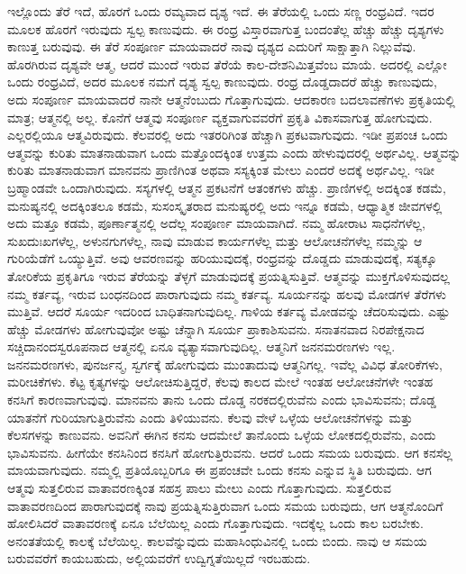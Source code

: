 ಇಲ್ಲೊಂದು ತೆರೆ ಇದೆ, ಹೊರಗೆ ಒಂದು ರಮ್ಯವಾದ ದೃಶ್ಯ ಇದೆ. ಈ ತೆರೆಯಲ್ಲಿ ಒಂದು ಸಣ್ಣ ರಂಧ್ರವಿದೆ. ಇದರ ಮೂಲಕ ಹೊರಗೆ ಇರುವುದು ಸ್ವಲ್ಪ ಕಾಣುವುದು. ಈ ರಂಧ್ರ ವಿಸ್ತಾರವಾಗುತ್ತ ಬಂದಂತೆಲ್ಲ ಹೆಚ್ಚು ಹೆಚ್ಚು ದೃಶ್ಯಗಳು ಕಾಣುತ್ತ ಬರುವುವು. ಈ ತೆರೆ ಸಂಪೂರ್ಣ ಮಾಯವಾದರೆ ನಾವು ದೃಶ್ಯದ ಎದುರಿಗೆ ಸಾಕ್ಷಾತ್ತಾಗಿ ನಿಲ್ಲುವೆವು. ಹೊರಗಿರುವ ದೃಶ್ಯವೇ ಆತ್ಮ, ಆದರೆ ಮುಂದೆ ಇರುವ ತೆರೆಯೆ ಕಾಲ-ದೇಶನಿಮಿತ್ತವೆಂಬ ಮಾಯೆ. ಅದರಲ್ಲಿ ಎಲ್ಲೋ ಒಂದು ರಂಧ್ರವಿದೆ, ಅದರ ಮೂಲಕ ನಮಗೆ ದೃಶ್ಯ ಸ್ವಲ್ಪ ಕಾಣುವುದು. ರಂಧ್ರ ದೊಡ್ಡದಾದರೆ ಹೆಚ್ಚು ಕಾಣುವುದು, ಅದು ಸಂಪೂರ್ಣ ಮಾಯವಾದರೆ ನಾನೇ ಆತ್ಮನೆಂಬುದು ಗೊತ್ತಾಗುವುದು. ಆದಕಾರಣ ಬದಲಾವಣೆಗಳು ಪ್ರಕೃತಿಯಲ್ಲಿ ಮಾತ್ರ; ಆತ್ಮನಲ್ಲಿ ಅಲ್ಲ. ಕೊನೆಗೆ ಆತ್ಮವು ಸಂಪೂರ್ಣ ವ್ಯಕ್ತವಾಗುವವರೆಗೆ ಪ್ರಕೃತಿ ವಿಕಾಸವಾಗುತ್ತ ಹೋಗುವುದು. ಎಲ್ಲರಲ್ಲಿಯೂ ಆತ್ಮವಿರುವುದು. ಕೆಲವರಲ್ಲಿ ಅದು ಇತರರಿಗಿಂತ ಹೆಚ್ಚಾಗಿ ಪ್ರಕಟವಾಗುವುದು. ಇಡೀ ಪ್ರಪಂಚ ಒಂದು ಆತ್ಮವನ್ನು ಕುರಿತು ಮಾತನಾಡುವಾಗ ಒಂದು ಮತ್ತೊಂದಕ್ಕಿಂತ ಉತ್ತಮ ಎಂದು ಹೇಳುವುದರಲ್ಲಿ ಅರ್ಥವಿಲ್ಲ. ಆತ್ಮವನ್ನು ಕುರಿತು ಮಾತನಾಡುವಾಗ ಮಾನವನು ಪ್ರಾಣಿಗಿಂತ ಅಥವಾ ಸಸ್ಯಕ್ಕಿಂತ ಮೇಲು ಎಂದರೆ ಅದಕ್ಕೆ ಅರ್ಥವಿಲ್ಲ. ಇಡೀ ಬ್ರಹ್ಮಾಂಡವೇ ಒಂದಾಗಿರುವುದು. ಸಸ್ಯಗಳಲ್ಲಿ ಆತ್ಮನ ಪ್ರಕಟನೆಗೆ ಆತಂಕಗಳು ಹೆಚ್ಚು. ಪ್ರಾಣಿಗಳಲ್ಲಿ ಅದಕ್ಕಿಂತ ಕಡಮೆ, ಮನುಷ್ಯನಲ್ಲಿ ಅದಕ್ಕಿಂತಲೂ ಕಡಮೆ, ಸುಸಂಸ್ಕೃತರಾದ ಮನುಷ್ಯರಲ್ಲಿ ಅದು ಇನ್ನೂ ಕಡಮೆ, ಆಧ್ಯಾತ್ಮಿಕ ಜೀವಗಳಲ್ಲಿ ಅದು ಮತ್ತೂ ಕಡಮೆ, ಪೂರ್ಣಾತ್ಮನಲ್ಲಿ ಅದೆಲ್ಲ ಸಂಪೂರ್ಣ ಮಾಯವಾಗಿದೆ. ನಮ್ಮ ಹೋರಾಟ ಸಾಧನೆಗಳೆಲ್ಲ, ಸುಖದುಃಖಗಳೆಲ್ಲ, ಅಳುನಗುಗಳೆಲ್ಲ, ನಾವು ಮಾಡುವ ಕಾರ್ಯಗಳೆಲ್ಲ ಮತ್ತು ಆಲೋಚನೆಗಳೆಲ್ಲ ನಮ್ಮನ್ನು ಆ ಗುರಿಯೆಡೆಗೆ ಒಯ್ಯುತ್ತಿವೆ. ಅವು ಆವರಣವನ್ನು ಹರಿಯುವುದಕ್ಕೆ, ರಂಧ್ರವನ್ನು ದೊಡ್ಡದು ಮಾಡುವುದಕ್ಕೆ, ಸತ್ಯಕ್ಕೂ ತೋರಿಕೆಯ ಪ್ರಕೃತಿಗೂ ಇರುವ ತೆರೆಯನ್ನು ತೆಳ್ಳಗೆ ಮಾಡುವುದಕ್ಕೆ ಪ್ರಯತ್ನಿಸುತ್ತಿವೆ. ಆತ್ಮವನ್ನು ಮುಕ್ತಗೊಳಿಸುವುದಲ್ಲ ನಮ್ಮ ಕರ್ತವ್ಯ, ಇರುವ ಬಂಧನದಿಂದ ಪಾರಾಗುವುದು ನಮ್ಮ ಕರ್ತವ್ಯ. ಸೂರ್ಯನನ್ನು ಹಲವು ಮೋಡಗಳ ತೆರೆಗಳು ಮುತ್ತಿವೆ. ಆದರೆ ಸೂರ್ಯ ಇದರಿಂದ ಬಾಧಿತನಾಗುವುದಿಲ್ಲ. ಗಾಳಿಯ ಕರ್ತವ್ಯ ಮೋಡವನ್ನು ಚೆದರಿಸುವುದು. ಎಷ್ಟು ಹೆಚ್ಚು ಮೋಡಗಳು ಹೋಗುವುವೋ ಅಷ್ಟು ಚೆನ್ನಾಗಿ ಸೂರ್ಯ ಪ್ರಾಕಾಶಿಸುವನು. ಸನಾತನವಾದ ನಿರಪೇಕ್ಷನಾದ ಸಚ್ಚಿದಾನಂದಸ್ವರೂಪನಾದ ಆತ್ಮನಲ್ಲಿ ಏನೂ ವ್ಯತ್ಯಾಸವಾಗುವುದಿಲ್ಲ. ಆತ್ಮನಿಗೆ ಜನನಮರಣಗಳು ಇಲ್ಲ. ಜನನಮರಣಗಳು, ಪುನರ್ಜನ್ಮ, ಸ್ವರ್ಗಕ್ಕೆ ಹೋಗುವುದು ಮುಂತಾದುವು ಆತ್ಮನಿಗಲ್ಲ. ಇವೆಲ್ಲ ವಿವಿಧ ತೋರಿಕೆಗಳು, ಮರೀಚಿಕೆಗಳು. ಕೆಟ್ಟ ಕೃತ್ಯಗಳನ್ನು ಆಲೋಚಿಸುತ್ತಿದ್ದರೆ, ಕೆಲವು ಕಾಲದ ಮೇಲೆ ಇಂತಹ ಆಲೋಚನೆಗಳೇ ಇಂತಹ ಕನಸಿಗೆ ಕಾರಣವಾಗುವುವು. ಮಾನವನು ತಾನು ಒಂದು ದೊಡ್ಡ ನರಕದಲ್ಲಿರುವೆನು ಎಂದು ಭಾವಿಸುವನು; ದೊಡ್ಡ ಯಾತನೆಗೆ ಗುರಿಯಾಗುತ್ತಿರುವೆನು ಎಂದು ತಿಳಿಯುವನು. ಕೆಲವು ವೇಳೆ ಒಳ್ಳೆಯ ಆಲೋಚನೆಗಳನ್ನು ಮತ್ತು ಕೆಲಸಗಳನ್ನು ಕಾಣುವನು. ಅವನಿಗೆ ಈಗಿನ ಕನಸು ಆದಮೇಲೆ ತಾನೊಂದು ಒಳ್ಳೆಯ ಲೋಕದಲ್ಲಿರುವೆನು, ಎಂದು ಭಾವಿಸುವನು. ಹೀಗೆಯೇ ಕನಸಿನಿಂದ ಕನಸಿಗೆ ಹೋಗುತ್ತಿರುವನು. ಆದರೆ ಒಂದು ಸಮಯ ಬರುವುದು. ಆಗ ಕನಸೆಲ್ಲ ಮಾಯವಾಗುವುದು. ನಮ್ಮಲ್ಲಿ ಪ್ರತಿಯೊಬ್ಬರಿಗೂ ಈ ಪ್ರಪಂಚವೇ ಒಂದು ಕನಸು ಎನ್ನುವ ಸ್ಥಿತಿ ಬರುವುದು. ಆಗ ಆತ್ಮವು ಸುತ್ತಲಿರುವ ವಾತಾವರಣಕ್ಕಿಂತ ಸಹಸ್ರ ಪಾಲು ಮೇಲು ಎಂದು ಗೊತ್ತಾಗುವುದು. ಸುತ್ತಲಿರುವ ವಾತಾವರಣದಿಂದ ಪಾರಾಗುವುದಕ್ಕೆ ನಾವು ಪ್ರಯತ್ನಿಸುತ್ತಿರುವಾಗ ಒಂದು ಸಮಯ ಬರುವುದು, ಆಗ ಆತ್ಮನೊಂದಿಗೆ ಹೋಲಿಸಿದರೆ ವಾತಾವರಣಕ್ಕೆ ಏನೂ ಬೆಲೆಯಿಲ್ಲ ಎಂದು ಗೊತ್ತಾಗುವುದು. ಇದಕ್ಕೆಲ್ಲ ಒಂದು ಕಾಲ ಬರಬೇಕು. ಅನಂತತೆಯಲ್ಲಿ ಕಾಲಕ್ಕೆ ಬೆಲೆಯಿಲ್ಲ. ಕಾಲವೆನ್ನುವುದು ಮಹಾಸಿಂಧುವಿನಲ್ಲಿ ಒಂದು ಬಿಂದು. ನಾವು ಆ ಸಮಯ ಬರುವವರೆಗೆ ಕಾಯಬಹುದು, ಅಲ್ಲಿಯವರೆಗೆ ಉದ್ವಿಗ್ನತೆಯಿಲ್ಲದೆ ಇರಬಹುದು.

